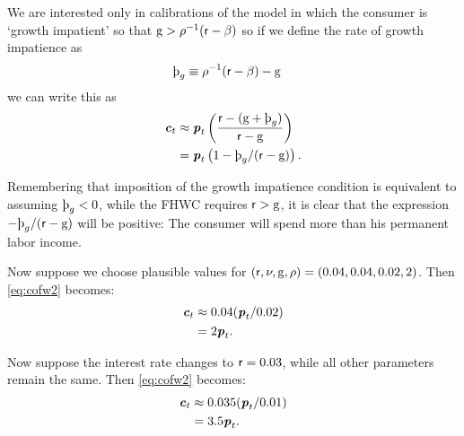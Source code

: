 \documentclass{scrartcl}
\begin{document}
We are interested only in calibrations of the model in which the consumer is `growth impatient' so that $\mathrm{g} > \rho^{-1}(\mathsf{r}-\beta)$ so if we define the rate of growth impatience as 
\begin{equation}\begin{gathered}\begin{aligned} \label{eq:patwGro}
\GPRte & \equiv  \CRRA^{-1}(\rfree-\DiscFac)-\WGroRte 
\end{aligned}\end{gathered}\end{equation}
we can write this as 
\begin{equation}\begin{gathered}\begin{aligned}
        \cLvl_{t} & \approx  \pLvl_{t} \left(\frac{\rfree - (\WGroRte+\GPRte)}{\rfree-\WGroRte}\right)
\\ & =  \pLvl_{t} \left(1 - \GPRte/(\rfree - \WGroRte)\right). \label{eq:CvsP}
\end{aligned}\end{gathered}\end{equation}

Remembering that imposition of the growth impatience condition is equivalent to assuming $\GPRte < 0$, while the FHWC requires $\mathsf{r} > \mathrm{g}$, it is clear that the expression $-\GPRte/(\rfree-\WGroRte)$ will be positive:  The consumer will spend more than his permanent labor income.

Now suppose we choose plausible values for $(\mathsf{r}, \nu, \mathrm{g}, \rho) = (0.04,0.04,0.02,2)$.
Then \eqref{eq:cofw2} becomes:
\begin{equation}\begin{gathered}\begin{aligned}
        \boldsymbol{\mathit{c}}_{t} & \approx  0.04 (\boldsymbol{\mathit{p}}_{t}/0.02) \\
         & =  2 \boldsymbol{\mathit{p}}_{t}.
\end{aligned}\end{gathered}\end{equation}

Now suppose the interest rate changes to $\mathsf{r}=0.03$, while all other parameters
remain the same.
Then \eqref{eq:cofw2} becomes:
\begin{equation}\begin{gathered}\begin{aligned}
        \boldsymbol{\mathit{c}}_{t} & \approx  0.035 (\boldsymbol{\mathit{p}}_{t}/0.01)  \\
         & =  3.5 \boldsymbol{\mathit{p}}_{t}.
\end{aligned}\end{gathered}\end{equation}
\end{document}
